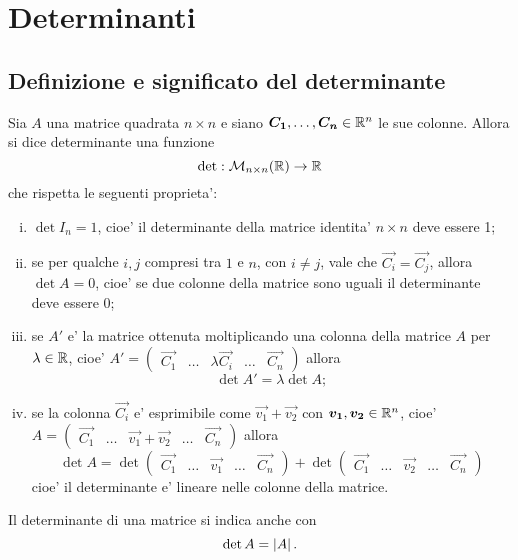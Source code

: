 
\chapter{Determinanti}

\section{Definizione e significato del determinante}

\begin{definition}
    Sia $A$ una matrice quadrata $n \times n$ e siano $\bm{C_1}, \dots, \bm{C_n} \in \mathbb{R}^n$ le sue colonne. Allora si dice determinante una funzione \[
        \det : \mathcal{M}_{n \times n}(\mathbb{R}) \to \mathbb{R} 
    \] che rispetta le seguenti proprieta':

    \begin{enumerate}[(i)]
        \item $\det I_n = 1$, cioe' il determinante della matrice identita' $n \times n$ deve essere 1;
        \item se per qualche $i, j$ compresi tra $1$ e $n$, con $i \neq j$, vale che $\vec{C_i} = \vec{C_j}$, allora $\det A = 0$, cioe' se due colonne della matrice sono uguali il determinante deve essere 0;
        \item se $A'$ e' la matrice ottenuta moltiplicando una colonna della matrice $A$ per $\lambda \in \mathbb{R}$, cioe' $A' = \begin{pmatrix} \vec{C_1} & \dots & \lambda \vec{C_i} & \dots & \vec{C_n} \end{pmatrix}$ allora \[\det A' = \lambda \det A;\]
        \item se la colonna $\vec{C_i}$ e' esprimibile come $\vec{v_1} + \vec{v_2}$ con $\bm{v_1}, \bm{v_2} \in \mathbb{R}^n$, cioe' $A = \begin{pmatrix} \vec{C_1} & \dots & \vec{v_1} + \vec{v_2} & \dots & \vec{C_n} \end{pmatrix}$
        allora \[
            \det A = \det \begin{pmatrix} \vec{C_1} & \dots & \vec{v_1} & \dots & \vec{C_n} \end{pmatrix} + \det \begin{pmatrix} \vec{C_1} & \dots & \vec{v_2} & \dots & \vec{C_n} \end{pmatrix} 
        \] cioe' il determinante e' lineare nelle colonne della matrice.
    \end{enumerate}
\end{definition}

Il determinante di una matrice si indica anche con \[
    \det A = \left|A\right|.    
\]

